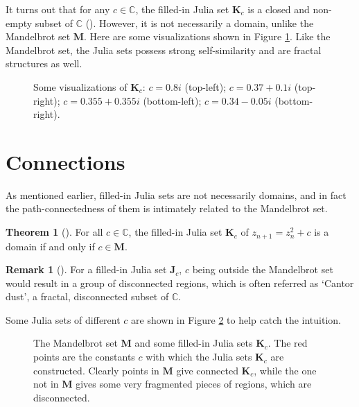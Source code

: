 \documentclass[a4paper,11pt]{article}
\theoremstyle{definition}
\newtheorem{thm}[prop]{Theorem}
\newtheorem{rmk}[prop]{Remark}
\begin{document}
It turns out that for any $c\in\mathbb{C}$, the filled-in Julia set $\mathbf{K}_c$ is a closed and non-empty subset of $\mathbb{C}$ (\autocite[Theorem 1]{bargmann}). However, it is not necessarily a domain, unlike the Mandelbrot set $\mathbf{M}$. Here are some visualizations shown in Figure \ref{fig:jula}. Like the Mandelbrot set, the Julia sets possess strong self-similarity and are fractal structures as well. 

\begin{figure}
    \caption{\autocite{bourke} Some visualizations of $\mathbf{K}_c$: $c = 0.8i$ (top-left); $c = 0.37+0.1i$ (top-right); $c = 0.355 + 0.355i$ (bottom-left); $c = 0.34 -0.05i$ (bottom-right).}
    \label{fig:jula}
\end{figure}

\section{Connections}

As mentioned earlier, filled-in Julia sets are not necessarily domains, and in fact the path-connectedness of them is intimately related to the Mandelbrot set.

\begin{thm}[{\autocite[Theorem 4 \& Corollary 5]{belk}}]
For all $c\in\mathbb{C}$, the filled-in Julia set $\mathbf{K}_c$ of $z_{n+1} = z_n^2+c$ is a domain if and only if $c\in \mathbf{M}$. 
\end{thm}

\begin{rmk}[{\autocite{bourke}}]
For a filled-in Julia set $\mathbf{J}_c$, $c$ being outside the Mandelbrot set would result in a group of disconnected regions, which is often referred as `Cantor dust', a fractal, disconnected subset of $\mathbb{C}$.
\end{rmk}

Some Julia sets of different $c$ are shown in Figure \ref{fig:cntd} to help catch the intuition.

\begin{figure}
    \caption{\autocite{bourke} The Mandelbrot set $\mathbf{M}$ and some filled-in Julia sets $\mathbf{K}_c$. The red points are the constants $c$ with which the Julia sets $\mathbf{K}_c$ are constructed. Clearly points in $\mathbf{M}$ give connected $\mathbf{K}_c$, while the one not in $\mathbf{M}$ gives some very fragmented pieces of regions, which are disconnected.}
    \label{fig:cntd}
\end{figure}
\end{document}
